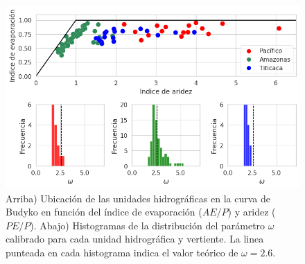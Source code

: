\begin{figure}[htb]
	\includegraphics[scale=.7]{Images/07_Curve_and_omega.png}
	\centering
	\caption{Arriba) Ubicación de las unidades hidrográficas en la curva de Budyko en función del índice de evaporación ($AE/P$) y aridez ($PE/P$). Abajo) Histogramas de la distribución del parámetro $\omega$ calibrado para cada unidad hidrográfica y vertiente. La linea punteada en cada histograma indica el valor teórico de $\omega = 2.6$.}
	\label{fig:07_Curve_and_omega}
\end{figure}
